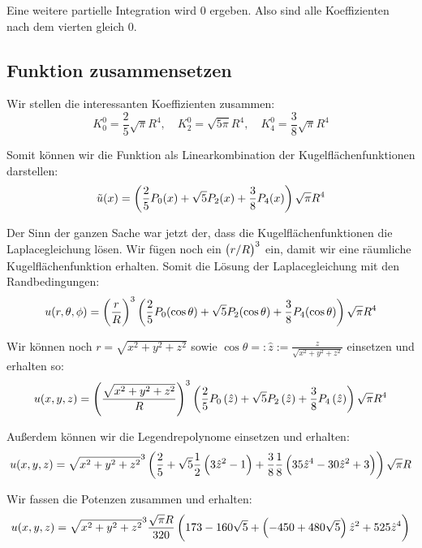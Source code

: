 \documentclass[11pt, ngerman, fleqn]{article}
\newcommand{\half}{\frac 12}
\begin{document}
Eine weitere partielle Integration wird 0 ergeben. Also sind alle Koeffizienten
nach dem vierten gleich 0.

\subsection{Funktion zusammensetzen}

Wir stellen die interessanten Koeffizienten zusammen:
\[
K_0^0 = \frac 25 \sqrt{\pi} R^4
,\quad
K_2^0 = \sqrt{5 \pi} R^4
,\quad
K_4^0 = \frac{3}{8} \sqrt{\pi} R^4
\]

Somit können wir die Funktion als Linearkombination der Kugelflächenfunktionen
darstellen:
\[
\tilde u(x) = \del{\frac 25 P_0(x) + \sqrt{5} P_2(x) + \frac{3}{8} P_4(x)} \sqrt{\pi} R^4
\]

Der Sinn der ganzen Sache war jetzt der, dass die Kugelflächenfunktionen die
Laplacegleichung lösen. Wir fügen noch ein $\del{r/R}^3$ ein, damit wir eine
räumliche Kugelflächenfunktion erhalten. Somit die Lösung der Laplacegleichung
mit den Randbedingungen:
\[
u(r, \theta, \phi) = \del{\frac rR}^3 \del{\frac 25 P_0(\cos \theta) + \sqrt{5} P_2(\cos \theta) + \frac{3}{8} P_4(\cos \theta)} \sqrt{\pi} R^4
\]

Wir können noch $r = \sqrt{x^2+y^2+z^2}$ sowie $\cos \theta =: \hat z :=
\frac{z}{\sqrt{x^2+y^2+z^2}}$ einsetzen und erhalten so:
\[
	u(x, y, z) = \del{\frac{\sqrt{x^2+y^2+z^2}}R}^3
					   \del{\frac 25 P_0\del{\hat z} + \sqrt{5} P_2\del{\hat z} + \frac{3}{8} P_4\del{\hat z}}
		   \sqrt{\pi} R^4
\]

Außerdem können wir die Legendrepolynome einsetzen und erhalten:
\[
	u(x, y, z) = \sqrt{x^2+y^2+z^2}^3
	\del{\frac 25 + \sqrt{5} \half \del{3 \hat z^2-1} + \frac{3}{8} \frac 18 \del{35 \hat z^4 - 30 \hat z^2 + 3}}
		   \sqrt{\pi} R
\]

Wir fassen die Potenzen zusammen und erhalten:
\[
	u(x, y, z) = \sqrt{x^2+y^2+z^2}^3
		   \frac{\sqrt{\pi} R}{320} \del{173- 160 \sqrt{5} + \del{- 450 + 480 \sqrt{5}} \hat z^2 + 525 \hat z^4}
\]



%
%
\end{document}
